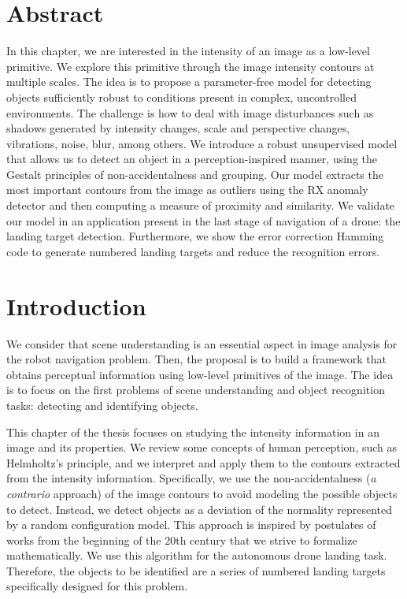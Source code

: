 \section*{Abstract}
\noindent In this chapter, we are interested in the intensity of an image as a low-level primitive. We explore this primitive through the image intensity contours at multiple scales. The idea is to propose a parameter-free model for detecting objects sufficiently robust to conditions present in complex, uncontrolled environments. The challenge is how to deal with image disturbances such as shadows generated by intensity changes, scale and perspective changes, vibrations, noise, blur, among others. We introduce a robust unsupervised model that allows us to detect an object in a perception-inspired manner, using the Gestalt principles of non-accidentalness and grouping. Our model extracts the most important contours from the image as outliers using the RX anomaly detector and then computing a measure of proximity and similarity. We validate our model in an application present in the last stage of navigation of a drone: the landing target detection. Furthermore, we show the error correction Hamming code to generate numbered landing targets and reduce the recognition errors.


\section{Introduction}\label{sec:introduction_ch1}
We consider that scene understanding is an essential aspect in image analysis for the robot navigation problem. Then, the proposal is to build a framework that obtains perceptual information using low-level primitives of the image. The idea is to focus on the first problems of scene understanding and object recognition tasks: detecting and identifying objects.  

This chapter of the thesis focuses on studying the intensity information in an image and its properties. We review some concepts of human perception, such as Helmholtz's principle, and we interpret and apply them to the contours extracted from the intensity information.  Specifically, we use the non-accidentalness (\textit{a contrario} approach) of the image contours to avoid modeling the possible objects to detect. Instead, we detect objects as a deviation of the normality represented by a random configuration model. This approach is inspired by postulates of works from the beginning of the 20th century that we strive to formalize mathematically. We use this algorithm for the autonomous drone landing task. Therefore, the objects to be identified are a series of numbered landing targets specifically designed for this problem.

